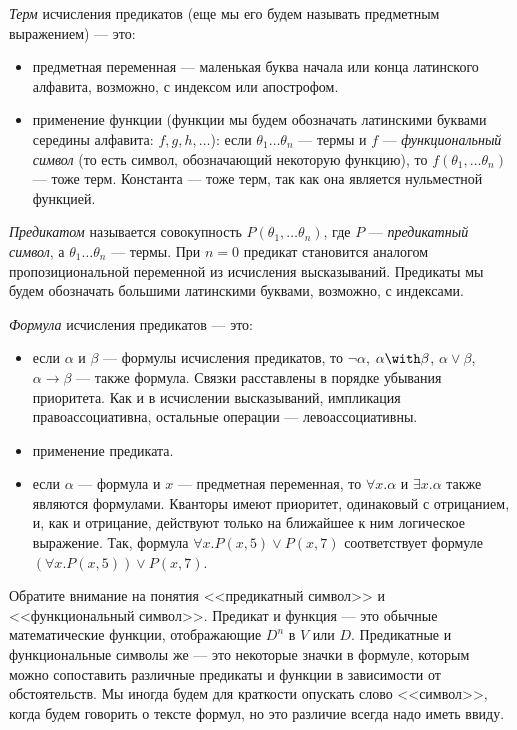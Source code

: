 \begin{definition}\emph{Терм} исчисления предикатов (еще мы его будем
называть предметным выражением) --- это:
\begin{itemize}
\item предметная переменная --- маленькая буква начала или конца латинского 
алфавита, возможно, с индексом или апострофом.
\item применение функции (функции мы будем обозначать латинскими 
буквами середины алфавита: $f, g, h, \dots$):
если $\theta_1 \dots \theta_n$ --- термы и $f$ --- 
\emph{функциональный символ} (то есть символ, обозначающий некоторую
функцию), то $f (\theta_1, \dots \theta_n)$ 
--- тоже терм. Константа --- тоже терм, так как она является нульместной функцией.
\end{itemize}
\end{definition}
\begin{definition}
\emph{Предикатом} называется совокупность $P (\theta_1, \dots \theta_n)$, где $P$ --- \emph{предикатный символ}, а $\theta_1 \dots \theta_n$ --- термы. При $n  = 0$ предикат становится аналогом пропозициональной переменной из исчисления высказываний. Предикаты мы будем обозначать большими латинскими буквами, возможно, с индексами.
\end{definition}
\begin{definition}\emph{Формула} исчисления предикатов --- это:
\begin{itemize}
\item если $\alpha$ и $\beta$ --- формулы исчисления предикатов, то 
$\neg \alpha$, $\alpha \with \beta$, $\alpha \vee \beta$, 
$\alpha \rightarrow \beta$ --- также формула. Связки расставлены
в порядке убывания приоритета. Как и в исчислении высказываний,
импликация правоассоциативна, остальные операции --- левоассоциативны.
\item применение предиката.
\item если $\alpha$ --- формула и $x$ --- предметная переменная, то
$\forall x. \alpha$ и $\exists x. \alpha$ также являются формулами. Кванторы
имеют приоритет, одинаковый с отрицанием, и, как и отрицание, действуют 
только на ближайшее к ним логическое выражение. Так, формула 
$\forall x. P(x,5) \vee P(x,7)$ соответствует формуле $(\forall x. P(x,5)) \vee P(x,7)$.
\end{itemize}
\end{definition}

Обратите внимание на понятия <<предикатный символ>> и <<функциональный символ>>.
Предикат и функция --- это обычные математические функции, отображающие
$D^n$ в $V$ или $D$. Предикатные и функциональные символы же --- это 
некоторые значки в формуле, которым можно сопоставить различные предикаты и 
функции в зависимости от обстоятельств. Мы иногда будем для краткости
опускать слово <<символ>>, когда будем говорить о тексте формул, но 
это различие всегда надо иметь ввиду.

